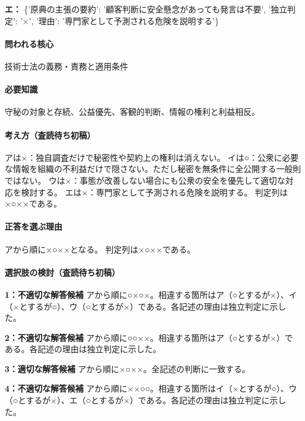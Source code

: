 \noindent\textbf{エ：} \{'原典の主張の要約': '顧客判断に安全懸念があっても発言は不要', '独立判定': '×', '理由': '専門家として予測される危険を説明する'\}\par

\paragraph{問われる核心} 技術士法の義務・責務と適用条件

\paragraph{必要知識} 守秘の対象と存続、公益優先、客観的判断、情報の権利と利益相反。

\paragraph{考え方（査読待ち初稿）} アは×：独自調査だけで秘密性や契約上の権利は消えない。 イは○：公衆に必要な情報を組織の不利益だけで隠さない。ただし秘密を無条件に全公開する一般則ではない。 ウは×：事態が改善しない場合にも公衆の安全を優先して適切な対応を検討する。 エは×：専門家として予測される危険を説明する。 判定列は×○××である。

\paragraph{正答を選ぶ理由} アから順に×○××となる。  判定列は×○××である。

\paragraph{選択肢の検討（査読待ち初稿）}\mbox{}\par

\noindent\textbf{1：不適切な解答候補} アから順に○×○×。相違する箇所はア（○とするが×）、イ（×とするが○）、ウ（○とするが×）である。各記述の理由は独立判定に示した。\par

\noindent\textbf{2：不適切な解答候補} アから順に○○××。相違する箇所はア（○とするが×）である。各記述の理由は独立判定に示した。\par

\noindent\textbf{3：適切な解答候補} アから順に×○××。全記述の判断に一致する。\par

\noindent\textbf{4：不適切な解答候補} アから順に××○○。相違する箇所はイ（×とするが○）、ウ（○とするが×）、エ（○とするが×）である。各記述の理由は独立判定に示した。\par

